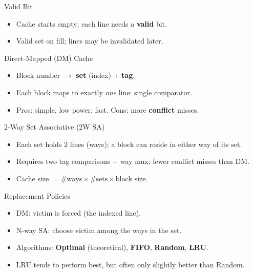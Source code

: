\documentclass[aspectratio=169,12pt]{beamer}
\begin{document}
\begin{frame}{Valid Bit}
\begin{itemize}
  \item Cache starts empty; each line needs a \textbf{valid} bit.
  \item Valid set on fill; lines may be invalidated later.
\end{itemize}
\end{frame}

\begin{frame}{Direct-Mapped (DM) Cache}
\begin{itemize}
  \item Block number $\rightarrow$ \textbf{set} (index) + \textbf{tag}.
  \item Each block maps to exactly \emph{one} line: single comparator.
  \item Pros: simple, low power, fast. Cons: more \textbf{conflict} misses.
\end{itemize}
\end{frame}

\begin{frame}{2-Way Set Associative (2W SA)}
\begin{itemize}
  \item Each set holds 2 lines (ways); a block can reside in either way of its set.
  \item Requires two tag comparisons + way mux; fewer conflict misses than DM.
  \item Cache size $=\#\text{ways}\times\#\text{sets}\times\text{block size}$.
\end{itemize}
\end{frame}

\begin{frame}{Replacement Policies}
\begin{itemize}
  \item DM: victim is forced (the indexed line).
  \item N-way SA: choose victim among the ways in the set.
  \item Algorithms: \textbf{Optimal} (theoretical), \textbf{FIFO}, \textbf{Random}, \textbf{LRU}.
  \item LRU tends to perform best, but often only slightly better than Random.
\end{itemize}
\end{frame}
\end{document}
